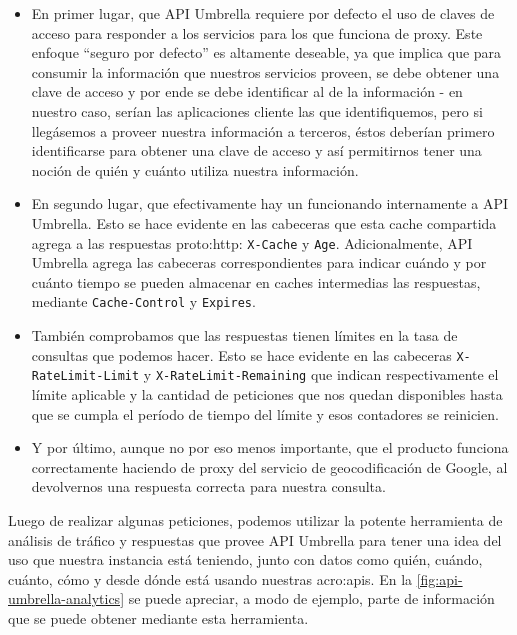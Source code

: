 \begin{itemize}
  \item En primer lugar, que API Umbrella requiere por defecto el uso de claves de acceso para responder a los servicios para los que funciona de proxy. Este enfoque ``seguro por defecto'' es altamente deseable, ya que implica que para consumir la información que nuestros servicios proveen, se debe obtener una clave de acceso y por ende se debe identificar al  de la información - en nuestro caso, serían las aplicaciones cliente las que identifiquemos, pero si llegásemos a proveer nuestra información a terceros, éstos deberían primero identificarse para obtener una clave de acceso y así permitirnos tener una noción de quién y cuánto utiliza nuestra información.
  \item En segundo lugar, que efectivamente hay un  funcionando internamente a API Umbrella. Esto se hace evidente en las cabeceras que esta cache compartida agrega a las respuestas \gls{proto:http}: \texttt{X-Cache} y \texttt{Age}. Adicionalmente, API Umbrella agrega las cabeceras correspondientes para indicar cuándo y por cuánto tiempo se pueden almacenar en caches intermedias las respuestas, mediante \texttt{Cache-Control} y \texttt{Expires}.
  \item También comprobamos que las respuestas tienen límites en la tasa de consultas que podemos hacer. Esto se hace evidente en las cabeceras \texttt{X-RateLimit-Limit} y \texttt{X-RateLimit-Remaining} que indican respectivamente el límite aplicable y la cantidad de peticiones que nos quedan disponibles hasta que se cumpla el período de tiempo del límite y esos contadores se reinicien.
  \item Y por último, aunque no por eso menos importante, que el producto funciona correctamente haciendo de proxy del servicio de geocodificación de Google, al devolvernos una respuesta correcta para nuestra consulta.
\end{itemize}

Luego de realizar algunas peticiones, podemos utilizar la potente herramienta de análisis de tráfico y respuestas que provee API Umbrella para tener una idea del uso que nuestra instancia está teniendo, junto con datos como quién, cuándo, cuánto, cómo y desde dónde está usando nuestras \glspl{acro:api}. En la \autoref{fig:api-umbrella-analytics} se puede apreciar, a modo de ejemplo, parte de información que se puede obtener mediante esta herramienta.

